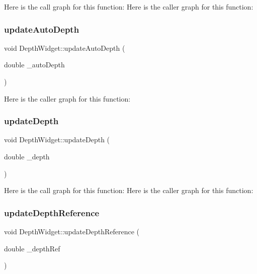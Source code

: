 Here is the call graph for this function\+:
Here is the caller graph for this function\+:
\mbox{\label{class_depth_widget_a860f4a3fcbfea2c39fa747b1ee810a17}} 
\subsubsection{\texorpdfstring{update\+Auto\+Depth}{updateAutoDepth}}
{\footnotesize\ttfamily void Depth\+Widget\+::update\+Auto\+Depth (\begin{DoxyParamCaption}\item[{double}]{\+\_\+auto\+Depth }\end{DoxyParamCaption})\hspace{0.3cm}{\ttfamily [slot]}}

Here is the caller graph for this function\+:
\mbox{\label{class_depth_widget_a44be5fa720f51307cd5b1d67ce6c2939}} 
\subsubsection{\texorpdfstring{update\+Depth}{updateDepth}}
{\footnotesize\ttfamily void Depth\+Widget\+::update\+Depth (\begin{DoxyParamCaption}\item[{double}]{\+\_\+depth }\end{DoxyParamCaption})\hspace{0.3cm}{\ttfamily [slot]}}

Here is the call graph for this function\+:
Here is the caller graph for this function\+:
\mbox{\label{class_depth_widget_a26a28ba4a8de2fce6d7a1e46e87b493e}} 
\subsubsection{\texorpdfstring{update\+Depth\+Reference}{updateDepthReference}}
{\footnotesize\ttfamily void Depth\+Widget\+::update\+Depth\+Reference (\begin{DoxyParamCaption}\item[{double}]{\+\_\+depth\+Ref }\end{DoxyParamCaption})\hspace{0.3cm}{\ttfamily [slot]}}

